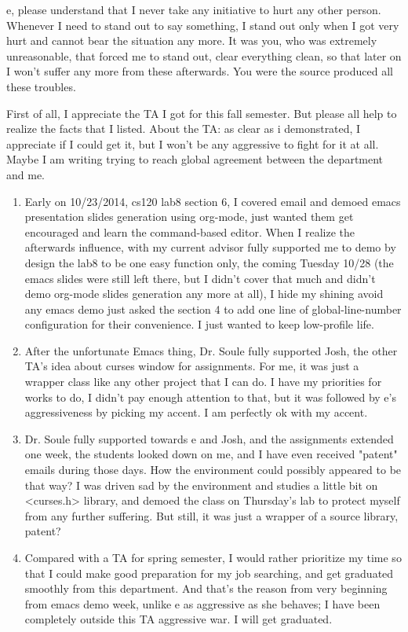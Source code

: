 \documentclass[12pt]{book}
\begin{document}
e, please understand that I never take any initiative to hurt any other person. Whenever I need to stand out to say something, I stand out only when I got very hurt and cannot bear the situation any more. It was you, who was extremely unreasonable, that forced me to stand out, clear everything clean, so that later on I won't suffer any more from these afterwards. You were the source produced all these troubles. 


First of all, I appreciate the TA I got for this fall semester. But please all help to realize the facts that I listed. About the TA: as clear as i demonstrated, I appreciate if I could get it, but I won't be any aggressive to fight for it at all. Maybe I am writing trying to reach global agreement between the department and me. 

\begin{enumerate}
\item Early on 10/23/2014, cs120 lab8 section 6, I covered email and demoed emacs presentation slides generation using org-mode, just wanted them get encouraged and learn the command-based editor. When I realize the afterwards influence, with my current advisor fully supported me to demo by design the lab8 to be one easy function only, the coming Tuesday 10/28 (the emacs slides were still left there, but I didn't cover that much and didn't demo org-mode slides generation any more at all), I hide my shining avoid any emacs demo just asked the section 4 to add one line of global-line-number configuration for their convenience. I just wanted to keep low-profile life.
\item After the unfortunate Emacs thing, Dr. Soule fully supported Josh, the other TA's idea about curses window for assignments. For me, it was just a wrapper class like any other project that I can do. I have my priorities for works to do, I didn't pay enough attention to that, but it was followed by e's aggressiveness by picking my accent. I am perfectly ok with my accent.
\item Dr. Soule fully supported towards e and Josh, and the assignments extended one week, the students looked down on me, and I have even received "patent" emails during those days. How the environment could possibly appeared to be that way? I was driven sad by the environment and studies a little bit on <curses.h> library, and demoed the class on Thursday's lab to protect myself from any further suffering. But still, it was just a wrapper of a source library, patent?
\item Compared with a TA for spring semester, I would rather prioritize my time so that I could make good preparation for my job searching, and get graduated smoothly from this department. And that's the reason from very beginning from emacs demo week, unlike e as aggressive as she behaves; I have been completely outside this TA aggressive war. I will get graduated.
\end{enumerate}
\end{document}
